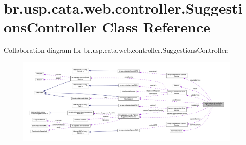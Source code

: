 \hypertarget{classbr_1_1usp_1_1cata_1_1web_1_1controller_1_1_suggestions_controller}{\section{br.\+usp.\+cata.\+web.\+controller.\+Suggestions\+Controller Class Reference}
\label{classbr_1_1usp_1_1cata_1_1web_1_1controller_1_1_suggestions_controller}
}


Collaboration diagram for br.\+usp.\+cata.\+web.\+controller.\+Suggestions\+Controller\+:\nopagebreak
\begin{figure}[H]
\begin{center}
\leavevmode
\includegraphics[width=350pt]{classbr_1_1usp_1_1cata_1_1web_1_1controller_1_1_suggestions_controller__coll__graph}
\end{center}
\end{figure}
